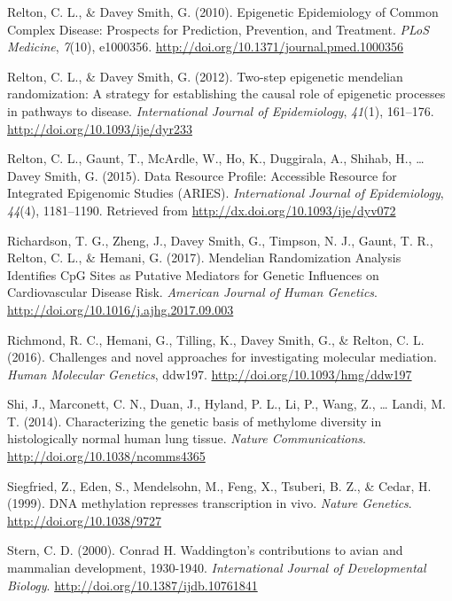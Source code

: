 \documentclass[11pt,twoside]{bristolthesis}
\newlength{\cslhangindent}
\newenvironment{cslreferences}%
  {\setlength{\parindent}{0pt}%
  \everypar{\setlength{\hangindent}{\cslhangindent}}\ignorespaces}%
  {\par}
\begin{document}
\begin{cslreferences}
\leavevmode\hypertarget{ref-Relton2010}{}%
Relton, C. L., \& Davey Smith, G. (2010). Epigenetic Epidemiology of Common Complex Disease: Prospects for Prediction, Prevention, and Treatment. \emph{PLoS Medicine}, \emph{7}(10), e1000356. \url{http://doi.org/10.1371/journal.pmed.1000356}

\leavevmode\hypertarget{ref-Relton2012}{}%
Relton, C. L., \& Davey Smith, G. (2012). Two-step epigenetic mendelian randomization: A strategy for establishing the causal role of epigenetic processes in pathways to disease. \emph{International Journal of Epidemiology}, \emph{41}(1), 161--176. \url{http://doi.org/10.1093/ije/dyr233}

\leavevmode\hypertarget{ref-Relton2015}{}%
Relton, C. L., Gaunt, T., McArdle, W., Ho, K., Duggirala, A., Shihab, H., \ldots{} Davey Smith, G. (2015). Data Resource Profile: Accessible Resource for Integrated Epigenomic Studies (ARIES). \emph{International Journal of Epidemiology}, \emph{44}(4), 1181--1190. Retrieved from \url{http://dx.doi.org/10.1093/ije/dyv072}

\leavevmode\hypertarget{ref-Richardson2017}{}%
Richardson, T. G., Zheng, J., Davey Smith, G., Timpson, N. J., Gaunt, T. R., Relton, C. L., \& Hemani, G. (2017). Mendelian Randomization Analysis Identifies CpG Sites as Putative Mediators for Genetic Influences on Cardiovascular Disease Risk. \emph{American Journal of Human Genetics}. \url{http://doi.org/10.1016/j.ajhg.2017.09.003}

\leavevmode\hypertarget{ref-Richmond2016}{}%
Richmond, R. C., Hemani, G., Tilling, K., Davey Smith, G., \& Relton, C. L. (2016). Challenges and novel approaches for investigating molecular mediation. \emph{Human Molecular Genetics}, ddw197. \url{http://doi.org/10.1093/hmg/ddw197}

\leavevmode\hypertarget{ref-Shi2014}{}%
Shi, J., Marconett, C. N., Duan, J., Hyland, P. L., Li, P., Wang, Z., \ldots{} Landi, M. T. (2014). Characterizing the genetic basis of methylome diversity in histologically normal human lung tissue. \emph{Nature Communications}. \url{http://doi.org/10.1038/ncomms4365}

\leavevmode\hypertarget{ref-Siegfried1999}{}%
Siegfried, Z., Eden, S., Mendelsohn, M., Feng, X., Tsuberi, B. Z., \& Cedar, H. (1999). DNA methylation represses transcription in vivo. \emph{Nature Genetics}. \url{http://doi.org/10.1038/9727}

\leavevmode\hypertarget{ref-Stern2000}{}%
Stern, C. D. (2000). Conrad H. Waddington's contributions to avian and mammalian development, 1930-1940. \emph{International Journal of Developmental Biology}. \url{http://doi.org/10.1387/ijdb.10761841}


\end{cslreferences}
\end{document}

